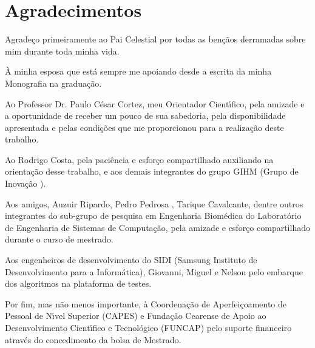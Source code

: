 \chapter*{Agradecimentos}
\label{CHP:ACKNOWLEDGMENT}%
\thispagestyle{empty}
Agrade\c{c}o primeiramente ao Pai Celestial por todas as ben\c{c}\~{a}os derramadas sobre mim
durante toda minha vida.

\`{A} minha esposa que est\'{a} sempre me apoiando desde a escrita da minha Monografia na gradua\c{c}\~{a}o.

Ao Professor Dr. Paulo C\'{e}sar Cortez, meu Orientador Cient\'{\i}fico, pela amizade e a oportunidade de receber um pouco de sua sabedoria, pela disponibilidade
apresentada e pelas condi\c{c}\~{o}es que me proporcionou para a realiza\c{c}\~{a}o
deste trabalho.

Ao Rodrigo Costa, pela paci\^{e}ncia e esfor\c{c}o compartilhado auxiliando na orienta\c{c}\~{a}o desse trabalho, e aos demais integrantes do grupo GIHM (Grupo de Inova\c{c}\~{a}o ).

Aos amigos, Auzuir Ripardo, Pedro Pedrosa , Tarique Cavalcante, dentre
outros integrantes do sub-grupo de pesquisa em Engenharia Biom\'{e}dica do Laborat\'{o}rio de Engenharia de Sistemas de Computa\c{c}\~{a}o, pela amizade e esfor\c{c}o compartilhado durante o curso de mestrado.

Aos engenheiros de desenvolvimento do SIDI (Samsung Instituto de Desenvolvimento para a Inform\'{a}tica), Giovanni, Miguel e Nelson pelo embarque dos algoritmos na plataforma de testes.

Por fim, mas n\~{a}o menos importante, \`{a} Coordena\c{c}\~{a}o de Aperfei\c{c}oamento de Pessoal de N\'{\i}vel Superior (CAPES) e Funda\c{c}\~{a}o Cearense de Apoio ao Desenvolvimento Cient\'{\i}fico e Tecnol\'{o}gico (FUNCAP) pelo suporte financeiro atrav\'{e}s do concedimento da bolsa de Mestrado.

